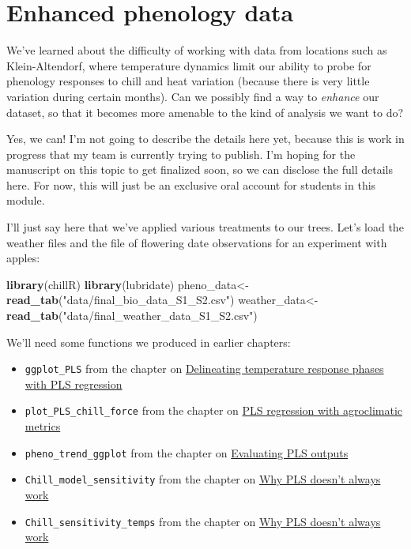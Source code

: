 \documentclass[
]{book}
\newenvironment{Shaded}{\begin{snugshade}}{\end{snugshade}}
\newcommand{\KeywordTok}[1]{\textcolor[rgb]{0.13,0.29,0.53}{\textbf{#1}}}
\newcommand{\NormalTok}[1]{#1}
\newcommand{\StringTok}[1]{\textcolor[rgb]{0.31,0.60,0.02}{#1}}
\providecommand{\tightlist}{%
  \setlength{\itemsep}{0pt}\setlength{\parskip}{0pt}}
\begin{document}
\hypertarget{enhanced-phenology-data}{%
\section{Enhanced phenology data}\label{enhanced-phenology-data}}

We've learned about the difficulty of working with data from locations such as Klein-Altendorf, where temperature dynamics limit our ability to probe for phenology responses to chill and heat variation (because there is very little variation during certain months). Can we possibly find a way to \emph{enhance} our dataset, so that it becomes more amenable to the kind of analysis we want to do?

Yes, we can! I'm not going to describe the details here yet, because this is work in progress that my team is currently trying to publish. I'm hoping for the manuscript on this topic to get finalized soon, so we can disclose the full details here. For now, this will just be an exclusive oral account for students in this module.

I'll just say here that we've applied various treatments to our trees. Let's load the weather files and the file of flowering date observations for an experiment with apples:

\begin{Shaded}
\begin{Highlighting}[]
\KeywordTok{library}\NormalTok{(chillR)}
\KeywordTok{library}\NormalTok{(lubridate)}
\NormalTok{pheno_data<-}\KeywordTok{read_tab}\NormalTok{(}\StringTok{"data/final_bio_data_S1_S2.csv"}\NormalTok{)}
\NormalTok{weather_data<-}\KeywordTok{read_tab}\NormalTok{(}\StringTok{"data/final_weather_data_S1_S2.csv"}\NormalTok{)}
\end{Highlighting}
\end{Shaded}

We'll need some functions we produced in earlier chapters:

\begin{itemize}
\tightlist
\item
  \texttt{ggplot\_PLS} from the chapter on \protect\hyperlink{pls_intro}{Delineating temperature response phases with PLS regression}
\item
  \texttt{plot\_PLS\_chill\_force} from the chapter on \protect\hyperlink{pls_chillforce}{PLS regression with agroclimatic metrics}
\item
  \texttt{pheno\_trend\_ggplot} from the chapter on \protect\hyperlink{pls_eval_PLS}{Evaluating PLS outputs}
\item
  \texttt{Chill\_model\_sensitivity} from the chapter on \protect\hyperlink{pls_chillforce_reflection}{Why PLS doesn't always work}
\item
  \texttt{Chill\_sensitivity\_temps} from the chapter on \protect\hyperlink{pls_chillforce_reflection}{Why PLS doesn't always work}
\end{itemize}
\end{document}

